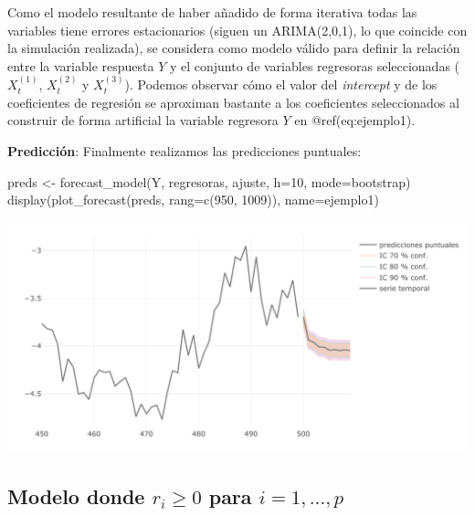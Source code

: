 \documentclass[
  12pt,
  a4paper]{article}
\newenvironment{Shaded}{\begin{snugshade}}{\end{snugshade}}
\newcommand{\AttributeTok}[1]{\textcolor[rgb]{0.77,0.63,0.00}{#1}}
\newcommand{\DecValTok}[1]{\textcolor[rgb]{0.00,0.00,0.81}{#1}}
\newcommand{\FunctionTok}[1]{\textcolor[rgb]{0.00,0.00,0.00}{#1}}
\newcommand{\NormalTok}[1]{#1}
\newcommand{\OtherTok}[1]{\textcolor[rgb]{0.56,0.35,0.01}{#1}}
\newcommand{\StringTok}[1]{\textcolor[rgb]{0.31,0.60,0.02}{#1}}
\begin{document}
Como el modelo resultante de haber añadido de forma iterativa todas las
variables tiene errores estacionarios (siguen un ARIMA(2,0,1), lo que
coincide con la simulación realizada), se considera como modelo válido
para definir la relación entre la variable respuesta \(Y\) y el conjunto
de variables regresoras seleccionadas (\(X_t^{(1)}\), \(X_t^{(2)}\) y
\(X_t^{(3)}\)). Podemos observar cómo el valor del \emph{intercept} y de
los coeficientes de regresión se aproximan bastante a los coeficientes
seleccionados al construir de forma artificial la variable regresora
\(Y\) en @ref(eq:ejemplo1).

\textbf{Predicción}: Finalmente realizamos las predicciones puntuales:

\begin{Shaded}
\begin{Highlighting}[]
\NormalTok{preds }\OtherTok{\textless{}{-}} \FunctionTok{forecast\_model}\NormalTok{(Y, regresoras, ajuste, }\AttributeTok{h=}\DecValTok{10}\NormalTok{, }\AttributeTok{mode=}\StringTok{\textquotesingle{}bootstrap\textquotesingle{}}\NormalTok{)}
\FunctionTok{display}\NormalTok{(}\FunctionTok{plot\_forecast}\NormalTok{(preds, }\AttributeTok{rang=}\FunctionTok{c}\NormalTok{(}\DecValTok{950}\NormalTok{, }\DecValTok{1009}\NormalTok{)), }\AttributeTok{name=}\StringTok{\textquotesingle{}ejemplo1\textquotesingle{}}\NormalTok{)}
\end{Highlighting}
\end{Shaded}

\begin{center}\includegraphics{figures/ejemplo1} \end{center}

\hypertarget{ejemplo2}{%
\subsection{\texorpdfstring{Modelo donde \(r_i\geq 0\) para
\(i=1,...,p\)}{Modelo donde r\_i\textbackslash geq 0 para i=1,...,p}}\label{ejemplo2}}
\end{document}
